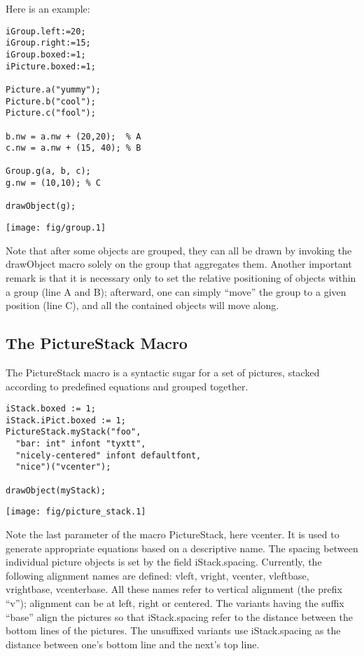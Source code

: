 \documentclass{article}
\newcommand{\code}{\ttfamily}
\begin{document}
Here is an example:

\begin{multicols}{2}
\begin{verbatim}
iGroup.left:=20;
iGroup.right:=15;
iGroup.boxed:=1;
iPicture.boxed:=1;

Picture.a("yummy");
Picture.b("cool");
Picture.c("fool");

b.nw = a.nw + (20,20);  % A
c.nw = a.nw + (15, 40); % B

Group.g(a, b, c);
g.nw = (10,10); % C

drawObject(g);
\end{verbatim}
\columnbreak
\hspace{1cm}\texttt{[image: fig/group.1]}
\end{multicols}

Note that after some objects are grouped, they can all be drawn
by invoking the {\code drawObject} macro solely on the group that aggregates them.
Another important remark is that it is necessary only to set the relative
positioning of objects within a group (line A and B); afterward, one can
simply ``move'' the group to a given position (line C), and all the contained
objects will move along.

\subsection{The PictureStack Macro}

The {\code PictureStack} macro is a syntactic sugar for a set of pictures,
stacked according to predefined equations and grouped together.

\begin{multicols}{2}
\begin{verbatim}
iStack.boxed := 1;
iStack.iPict.boxed := 1;
PictureStack.myStack("foo",
  "bar: int" infont "tyxtt",
  "nicely-centered" infont defaultfont,
  "nice")("vcenter");

drawObject(myStack);
\end{verbatim}
\columnbreak
\hspace{1cm}\texttt{[image: fig/picture\_stack.1]}
\end{multicols}

Note the last parameter of the macro {\code PictureStack}, here {\code vcenter}.
It is used to generate appropriate equations based on a descriptive name.
The spacing between individual picture objects is set by the field
{\code iStack.spacing}. Currently, the following alignment names are
defined: {\code vleft}, {\code vright}, {\code vcenter},
{\code vleftbase}, {\code vrightbase}, {\code vcenterbase}. All these
names refer to vertical alignment (the prefix ``{\code v}''); alignment can
be at left, right or centered. The variants having the suffix ``{\code base}'' align
the pictures so that {\code iStack.spacing} refer to the distance between the
bottom lines of the pictures. The unsuffixed variants use {\code iStack.spacing} as
the distance between one's bottom line and the next's top line.
\end{document}
